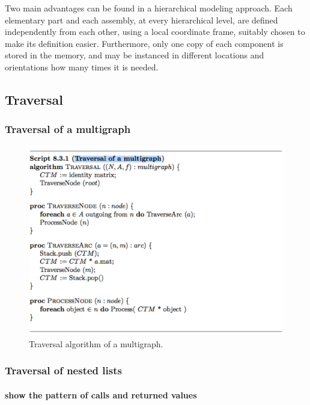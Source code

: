 \documentclass[11pt,oneside]{article}	%
\begin{document}
Two main advantages can be found in a hierarchical modeling approach. Each elementary part and each assembly, at every hierarchical level, are defined independently from each other, using a local coordinate frame, suitably chosen to make its definition easier. Furthermore, only one copy of each component is stored in the memory, and may be instanced in different locations and orientations how many times it is needed.

\subsection{Traversal}

\subsubsection{Traversal of a multigraph}

\begin{figure}[htbp] %
   \centering
   \includegraphics[width=0.8\linewidth]{images/traversal} 
   \caption{Traversal algorithm of a multigraph.}
   \label{fig:example}
\end{figure}


\subsubsection{Traversal of nested lists}

\paragraph{show the pattern of calls and returned values}
\end{document}
